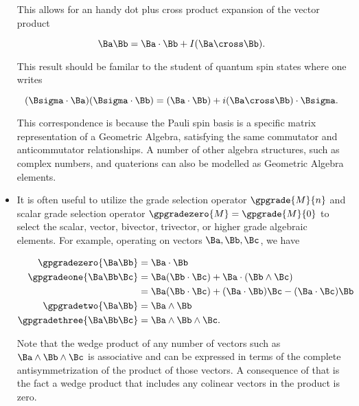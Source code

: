 \begin{itemize}
This allows for an handy dot plus cross product expansion of the vector product

\begin{dmath}\label{eqn:emtProblemSet1Appendix:180}
\Ba \Bb = \Ba \cdot \Bb + I (\Ba \cross \Bb).
\end{dmath}

This result should be familar to the student of quantum spin states where one writes

\begin{dmath}\label{eqn:emtProblemSet1Appendix:200}
(\Bsigma \cdot \Ba) (\Bsigma \cdot \Bb) = (\Ba \cdot \Bb) + i (\Ba \cross \Bb) \cdot \Bsigma.
\end{dmath}

This correspondence is because the Pauli spin basis is a specific matrix representation of a Geometric Algebra, satisfying the same commutator and anticommutator relationships.  A number of other algebra structures, such as complex numbers, and quaterions can also be modelled as Geometric Algebra elements.
\item It is often useful to utilize the grade selection operator
\( \gpgrade{M}{n} \) and scalar grade selection operator \( \gpgradezero{M} = \gpgrade{M}{0} \)
to select the scalar, vector, bivector, trivector, or higher grade algebraic elements.  For example, operating on vectors \( \Ba, \Bb, \Bc \), we have

\begin{dmath}\label{eqn:emtProblemSet1Appendix:580}
\begin{aligned}
\gpgradezero{ \Ba \Bb }
&= \Ba \cdot \Bb \\
\gpgradeone{ \Ba \Bb \Bc }
&= 
\Ba (\Bb \cdot \Bc)
+ 
\Ba \cdot (\Bb \wedge \Bc) \\
&=
\Ba (\Bb \cdot \Bc)
+ 
(\Ba \cdot \Bb) \Bc
- 
(\Ba \cdot \Bc) \Bb \\
\gpgradetwo{\Ba \Bb} &=
\Ba \wedge \Bb \\
\gpgradethree{\Ba \Bb \Bc} &=
\Ba \wedge \Bb \wedge \Bc.
\end{aligned}
\end{dmath}

Note that the wedge product of any number of vectors such as \( \Ba \wedge \Bb \wedge \Bc \) is associative and can be expressed in terms of the complete antisymmetrization of the product of those vectors.  A consequence of that is the fact a wedge product that includes any colinear vectors in the product is zero.
\end{itemize}

